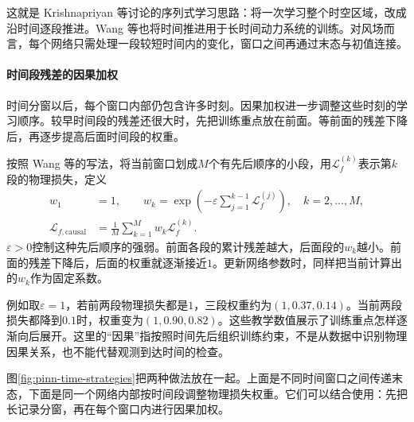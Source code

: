 这就是 Krishnapriyan 等讨论的序列式学习思路：将一次学习整个时空区域，改成沿时间逐段推进\cite{krishnapriyan2021failure}。Wang 等也将时间推进用于长时间动力系统的训练\cite{wang2023expert}。对风场而言，每个网络只需处理一段较短时间内的变化，窗口之间再通过末态与初值连接。

\paragraph{时间段残差的因果加权}
时间分窗以后，每个窗口内部仍包含许多时刻。因果加权进一步调整这些时刻的学习顺序。较早时间段的残差还很大时，先把训练重点放在前面。等前面的残差下降后，再逐步提高后面时间段的权重。

按照 Wang 等的写法，将当前窗口划成$M$个有先后顺序的小段，用$\mathcal L_f^{(k)}$表示第$k$段的物理损失，定义
\begin{align}
 w_1&=1,\qquad
 w_k=\exp\left(-\varepsilon\sum_{j=1}^{k-1}\mathcal L_f^{(j)}\right),
 \quad k=2,\ldots,M,\\
 \mathcal L_{f,\mathrm{causal}}
 &=\frac1M\sum_{k=1}^{M}w_k\mathcal L_f^{(k)}.
 \label{eq:pinn-causal-weight}
\end{align}
$\varepsilon>0$控制这种先后顺序的强弱。前面各段的累计残差越大，后面段的$w_k$越小。前面的残差下降后，后面的权重就逐渐接近$1$。更新网络参数时，同样把当前计算出的$w_k$作为固定系数\cite{wang2023expert}。

例如取$\varepsilon=1$，若前两段物理损失都是$1$，三段权重约为$(1,0.37,0.14)$。当前两段损失都降到$0.1$时，权重变为$(1,0.90,0.82)$。这些教学数值展示了训练重点怎样逐渐向后展开。这里的“因果”指按照时间先后组织训练约束，不是从数据中识别物理因果关系，也不能代替观测到达时间的检查。

图\ref{fig:pinn-time-strategies}把两种做法放在一起。上面是不同时间窗口之间传递末态，下面是同一个网络内部按时间段调整物理损失权重。它们可以结合使用：先把长记录分窗，再在每个窗口内进行因果加权。

